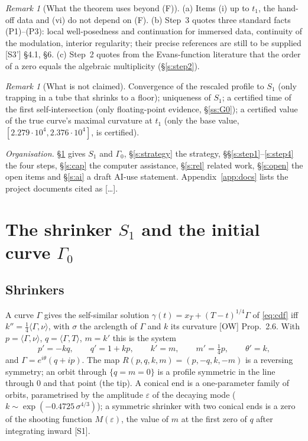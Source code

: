 \documentclass[11pt]{amsart}
\theoremstyle{definition}
\theoremstyle{remark}
\newtheorem{remark}[theorem]{Remark}
\newcommand{\eps}{\varepsilon}
\newcommand{\ip}[2]{\langle #1,#2\rangle}
\newcommand{\dref}[1]{[\textsf{#1}]}
\begin{document}
\begin{remark}[What the theorem uses beyond (F)]\label{rem:uses}
(a) Items (i) up to $t_1$, the hand-off data and (vi) do not depend on (F). (b) Step~3 quotes three standard facts (P1)--(P3): local well-posedness and continuation for immersed data, continuity of the modulation, interior regularity; their precise references are still to be supplied \dref{S3'} \S4.1, \S6. (c) Step~2 quotes from the Evans-function literature that the order of a zero equals the algebraic multiplicity \cite{AlexanderGardnerJones1990,KapitulaPromislow2013,LatushkinSukhtayev2010} (\S\ref{s:step2}).
\end{remark}

\begin{remark}[What is not claimed]
Convergence of the rescaled profile to $S_1$ (only trapping in a tube that shrinks to a floor); uniqueness of $S_1$; a certified time of the first self-intersection (only floating-point evidence, \S\ref{ss:G0}); a certified value of the true curve's maximal curvature at $t_1$ (only the base value, $[2.279\cdot10^4,2.376\cdot10^4]$, is certified).
\end{remark}

\noindent\emph{Organisation.} \S\ref{s:data} gives $S_1$ and $\Gamma_0$, \S\ref{s:strategy} the strategy, \S\S\ref{s:step1}--\ref{s:step4} the four steps, \S\ref{s:cap} the computer assistance, \S\ref{s:rel} related work, \S\ref{s:open} the open items and \S\ref{s:ai} a draft AI-use statement. Appendix~\ref{app:docs} lists the project documents cited as \dref{\dots}.

\section{The shrinker \texorpdfstring{$S_1$}{S1} and the initial curve \texorpdfstring{$\Gamma_0$}{Gamma0}}\label{s:data}

\subsection{Shrinkers}
A curve $\Gamma$ gives the self-similar solution $\gamma(t)=x_T+(T-t)^{1/4}\Gamma$ of \eqref{eq:cdf} iff $k''=\frac14\ip{\Gamma}{\nu}$, with $\sigma$ the arclength of $\Gamma$ and $k$ its curvature \dref{OW} Prop.~2.6. With $p=\ip\Gamma\nu$, $q=\ip\Gamma T$, $m=k'$ this is the system
\begin{equation}\label{eq:prof}
p'=-kq,\qquad q'=1+kp,\qquad k'=m,\qquad m'=\tfrac14p,\qquad\theta'=k,
\end{equation}
and $\Gamma=e^{i\theta}(q+ip)$. The map $R(p,q,k,m)=(p,-q,k,-m)$ is a reversing symmetry; an orbit through $\{q=m=0\}$ is a profile symmetric in the line through $0$ and that point (the tip). A conical end is a one-parameter family of orbits, parametrised by the amplitude $\eps$ of the decaying mode ($k\sim\exp(-0.4725\,\sigma^{4/3})$); a symmetric shrinker with two conical ends is a zero of the shooting function $M(\eps)$, the value of $m$ at the first zero of $q$ after integrating inward \dref{S1}.
\end{document}

